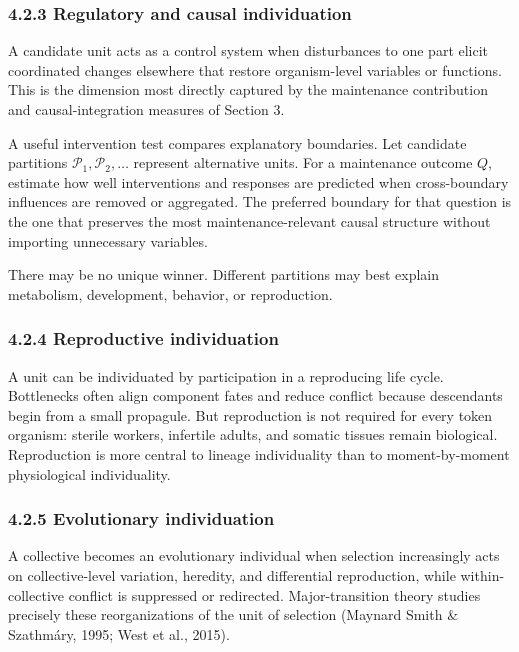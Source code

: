 \documentclass[
  11pt,
]{article}
\begin{document}
\subsubsection{4.2.3 Regulatory and causal
individuation}\label{regulatory-and-causal-individuation}

A candidate unit acts as a control system when disturbances to one part
elicit coordinated changes elsewhere that restore organism-level
variables or functions. This is the dimension most directly captured by
the maintenance contribution and causal-integration measures of Section
3.

A useful intervention test compares explanatory boundaries. Let
candidate partitions \(\mathcal P_1,\mathcal P_2,\dots\) represent
alternative units. For a maintenance outcome \(Q\), estimate how well
interventions and responses are predicted when cross-boundary influences
are removed or aggregated. The preferred boundary for that question is
the one that preserves the most maintenance-relevant causal structure
without importing unnecessary variables.

There may be no unique winner. Different partitions may best explain
metabolism, development, behavior, or reproduction.

\subsubsection{4.2.4 Reproductive
individuation}\label{reproductive-individuation}

A unit can be individuated by participation in a reproducing life cycle.
Bottlenecks often align component fates and reduce conflict because
descendants begin from a small propagule. But reproduction is not
required for every token organism: sterile workers, infertile adults,
and somatic tissues remain biological. Reproduction is more central to
lineage individuality than to moment-by-moment physiological
individuality.

\subsubsection{4.2.5 Evolutionary
individuation}\label{evolutionary-individuation}

A collective becomes an evolutionary individual when selection
increasingly acts on collective-level variation, heredity, and
differential reproduction, while within-collective conflict is
suppressed or redirected. Major-transition theory studies precisely
these reorganizations of the unit of selection (Maynard Smith \&
Szathmáry, 1995; West et al., 2015).
\end{document}
